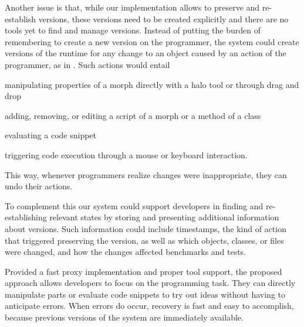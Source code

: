 Another issue is that, while our implementation allows to preserve and re-establish versions, these versions need to be created explicitly and there are no tools yet to find and manage versions.
Instead of putting the burden of remembering to create a new version on the programmer, the system could create versions of the runtime for any change to an object caused by an action of the programmer, as in \coexist.
Such actions would entail
\begin{inparaenum}[a)]
    \item manipulating properties of a morph directly with a halo tool or through drag and drop
    \item adding, removing, or editing a script of a morph or a method of a class
    \item evaluating a code snippet
    \item triggering code execution through a mouse or keyboard interaction.
\end{inparaenum}
This way, whenever programmers realize changes were inappropriate, they can undo their actions.

To complement this our system could support developers in
finding and re-establishing relevant states by storing and presenting
additional information about versions. Such information could include
timestamps, the kind of action that triggered preserving the version,
as well as which objects, classes, or files were changed, and how the
changes affected benchmarks and tests.

Provided a fast proxy implementation and proper tool support, the
proposed approach allows developers to focus on the programming task.
They can directly manipulate parts or evaluate code snippets to try
out ideas without having to anticipate errors. When errors do occur,
recovery is fast and easy to accomplish, because previous versions of
the system are immediately available.


